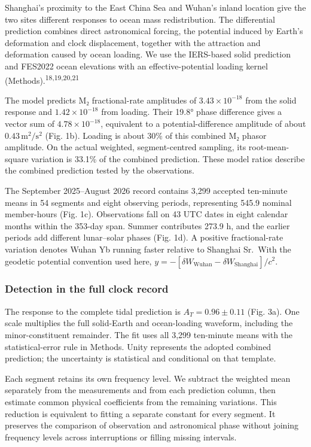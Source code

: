 \documentclass[
  12pt,
  a4paper,
]{article}
\begin{document}
Shanghai's proximity to the East China Sea and Wuhan's inland location
give the two sites different responses to ocean mass redistribution. The
differential prediction combines direct astronomical forcing, the
potential induced by Earth's deformation and clock displacement,
together with the attraction and deformation caused by ocean loading. We
use the IERS-based solid prediction and FES2022 ocean elevations with an
effective-potential loading kernel
(Methods).\textsuperscript{18,19,20,21}

The model predicts M₂ fractional-rate amplitudes of
\(3.43\times10^{-18}\) from the solid response and
\(1.42\times10^{-18}\) from loading. Their 19.8° phase difference gives
a vector sum of \(4.78\times10^{-18}\), equivalent to a
potential-difference amplitude of about \(0.43\,\mathrm{m^2/s^2}\) (Fig.
1b). Loading is about 30\% of this combined M₂ phasor amplitude. On the
actual weighted, segment-centred sampling, its root-mean-square
variation is 33.1\% of the combined prediction. These model ratios
describe the combined prediction tested by the observations.

The September 2025--August 2026 record contains 3,299 accepted
ten-minute means in 54 segments and eight observing periods,
representing 545.9 nominal member-hours (Fig. 1c). Observations fall on
43 UTC dates in eight calendar months within the 353-day span. Summer
contributes 273.9 h, and the earlier periods add different lunar--solar
phases (Fig. 1d). A positive fractional-rate variation denotes Wuhan Yb
running faster relative to Shanghai Sr.~With the geodetic potential
convention used here,
\(y=-[\delta W_{\mathrm{Wuhan}}-\delta W_{\mathrm{Shanghai}}]/c^2\).

\hypertarget{detection-in-the-full-clock-record}{%
\subsubsection{Detection in the full clock
record}\label{detection-in-the-full-clock-record}}

The response to the complete tidal prediction is \(A_T=0.96\pm0.11\)
(Fig. 3a). One scale multiplies the full solid-Earth and ocean-loading
waveform, including the minor-constituent remainder. The fit uses all
3,299 ten-minute means with the statistical-error rule in Methods. Unity
represents the adopted combined prediction; the uncertainty is
statistical and conditional on that template.

Each segment retains its own frequency level. We subtract the weighted
mean separately from the measurements and from each prediction column,
then estimate common physical coefficients from the remaining
variations. This reduction is equivalent to fitting a separate constant
for every segment. It preserves the comparison of observation and
astronomical phase without joining frequency levels across interruptions
or filling missing intervals.
\end{document}
